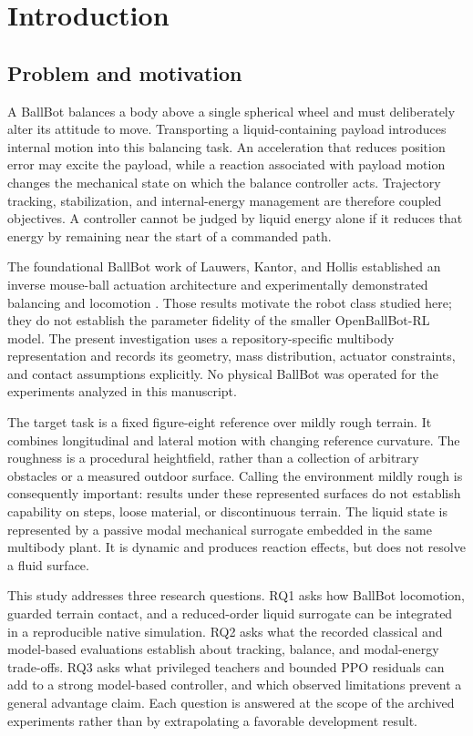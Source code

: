 \section{Introduction}
\subsection{Problem and motivation}
A BallBot balances a body above a single spherical wheel and must deliberately alter its attitude to move. Transporting a liquid-containing payload introduces internal motion into this balancing task. An acceleration that reduces position error may excite the payload, while a reaction associated with payload motion changes the mechanical state on which the balance controller acts. Trajectory tracking, stabilization, and internal-energy management are therefore coupled objectives. A controller cannot be judged by liquid energy alone if it reduces that energy by remaining near the start of a commanded path.

The foundational BallBot work of Lauwers, Kantor, and Hollis established an inverse mouse-ball actuation architecture and experimentally demonstrated balancing and locomotion \cite{lauwers2006}. Those results motivate the robot class studied here; they do not establish the parameter fidelity of the smaller OpenBallBot-RL model. The present investigation uses a repository-specific multibody representation and records its geometry, mass distribution, actuator constraints, and contact assumptions explicitly. No physical BallBot was operated for the experiments analyzed in this manuscript.

The target task is a fixed figure-eight reference over mildly rough terrain. It combines longitudinal and lateral motion with changing reference curvature. The roughness is a procedural heightfield, rather than a collection of arbitrary obstacles or a measured outdoor surface. Calling the environment mildly rough is consequently important: results under these represented surfaces do not establish capability on steps, loose material, or discontinuous terrain. The liquid state is represented by a passive modal mechanical surrogate embedded in the same multibody plant. It is dynamic and produces reaction effects, but does not resolve a fluid surface.

This study addresses three research questions. RQ1 asks how BallBot locomotion, guarded terrain contact, and a reduced-order liquid surrogate can be integrated in a reproducible native simulation. RQ2 asks what the recorded classical and model-based evaluations establish about tracking, balance, and modal-energy trade-offs. RQ3 asks what privileged teachers and bounded PPO residuals can add to a strong model-based controller, and which observed limitations prevent a general advantage claim. Each question is answered at the scope of the archived experiments rather than by extrapolating a favorable development result.

